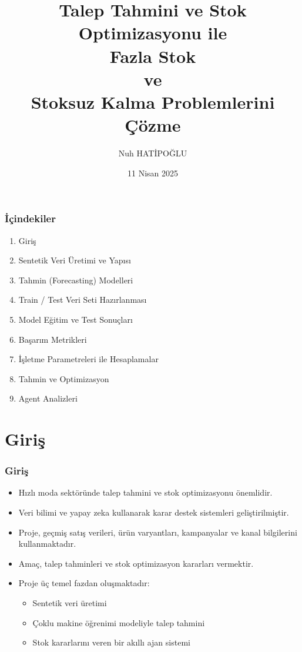 \documentclass[12pt]{beamer}
\title{Talep Tahmini ve Stok Optimizasyonu ile \\ Fazla Stok \\ ve \\ Stoksuz
	Kalma Problemlerini Çözme}
\author{Nuh HATİPOĞLU}
\date{11 Nisan 2025}
\begin{document}
\begin{frame}
	\titlepage
\end{frame}

\begin{frame}
	\frametitle{İçindekiler}
	\begin{enumerate}
		\item Giriş
		\item Sentetik Veri Üretimi ve Yapısı
		\item Tahmin (Forecasting) Modelleri
		\item Train / Test Veri Seti Hazırlanması
		\item Model Eğitim ve Test Sonuçları
		\item Başarım Metrikleri
		\item İşletme Parametreleri ile Hesaplamalar
		\item Tahmin ve Optimizasyon
		\item Agent Analizleri
	\end{enumerate}

\end{frame}

\section{Giriş}
\begin{frame}
	\frametitle{Giriş}
	\begin{itemize}
		\item Hızlı moda sektöründe talep tahmini ve stok
		      optimizasyonu önemlidir.
		\item Veri bilimi ve yapay zeka kullanarak karar destek
		      sistemleri geliştirilmiştir.
		\item Proje, geçmiş satış verileri, ürün varyantları,
		      kampanyalar ve kanal bilgilerini kullanmaktadır.
		\item Amaç, talep tahminleri ve stok optimizasyon
		      kararları vermektir.
		\item Proje üç temel fazdan oluşmaktadır:
		      \begin{itemize}
			      \item Sentetik veri üretimi
			      \item Çoklu makine öğrenimi modeliyle talep
			            tahmini
			      \item Stok kararlarını veren bir akıllı ajan
			            sistemi
		      \end{itemize}
	\end{itemize} %
\end{frame}
\end{document}
